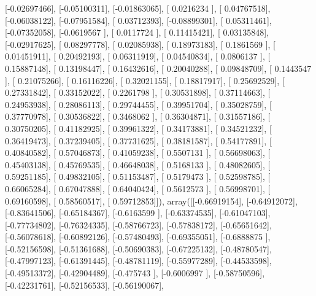 \documentclass{article}
\begin{document}
       [-0.02697466],
       [-0.05100311],
       [-0.01863065],
       [ 0.0216234 ],
       [ 0.04767518],
       [-0.06038122],
       [-0.07951584],
       [ 0.03712393],
       [-0.08899301],
       [ 0.05311461],
       [-0.07352058],
       [-0.0619567 ],
       [ 0.0117724 ],
       [ 0.11415421],
       [ 0.03135848],
       [-0.02917625],
       [ 0.08297778],
       [ 0.02085938],
       [ 0.18973183],
       [ 0.1861569 ],
       [ 0.01451911],
       [ 0.20492193],
       [ 0.06311919],
       [ 0.04540834],
       [ 0.0806137 ],
       [ 0.15887148],
       [ 0.13198447],
       [ 0.16432616],
       [ 0.20040288],
       [ 0.09848709],
       [ 0.1443547 ],
       [ 0.21075266],
       [ 0.16116226],
       [ 0.32021155],
       [ 0.18817917],
       [ 0.25692529],
       [ 0.27331842],
       [ 0.33152022],
       [ 0.2261798 ],
       [ 0.30531898],
       [ 0.37114663],
       [ 0.24953938],
       [ 0.28086113],
       [ 0.29744455],
       [ 0.39951704],
       [ 0.35028759],
       [ 0.37770978],
       [ 0.30536822],
       [ 0.3468062 ],
       [ 0.36304871],
       [ 0.31557186],
       [ 0.30750205],
       [ 0.41182925],
       [ 0.39961322],
       [ 0.34173881],
       [ 0.34521232],
       [ 0.36419473],
       [ 0.37239405],
       [ 0.37731625],
       [ 0.38181587],
       [ 0.54177891],
       [ 0.40840582],
       [ 0.57046873],
       [ 0.41059238],
       [ 0.5507131 ],
       [ 0.56698063],
       [ 0.45403138],
       [ 0.45769535],
       [ 0.46648038],
       [ 0.5168133 ],
       [ 0.48082605],
       [ 0.59251185],
       [ 0.49832105],
       [ 0.51153487],
       [ 0.5179473 ],
       [ 0.52598785],
       [ 0.66065284],
       [ 0.67047888],
       [ 0.64040424],
       [ 0.5612573 ],
       [ 0.56998701],
       [ 0.69160598],
       [ 0.58560517],
       [ 0.59712853]]), array([[-0.66919154],
       [-0.64912072],
       [-0.83641506],
       [-0.65184367],
       [-0.6163599 ],
       [-0.63374535],
       [-0.61047103],
       [-0.77734802],
       [-0.76324335],
       [-0.58766723],
       [-0.57838172],
       [-0.65651642],
       [-0.56078618],
       [-0.60892126],
       [-0.57480493],
       [-0.69355051],
       [-0.6888875 ],
       [-0.52156598],
       [-0.51361688],
       [-0.50690383],
       [-0.67225132],
       [-0.48780547],
       [-0.47997123],
       [-0.61391445],
       [-0.48781119],
       [-0.55977289],
       [-0.44533598],
       [-0.49513372],
       [-0.42904489],
       [-0.475743  ],
       [-0.6006997 ],
       [-0.58750596],
       [-0.42231761],
       [-0.52156533],
       [-0.56190067],
\end{document}
